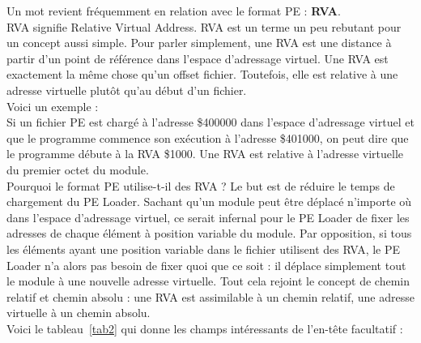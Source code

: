 Un mot revient fréquemment en relation avec le format PE : \textbf{RVA}.\\
RVA signifie Relative Virtual Address. RVA est un terme un peu rebutant pour un concept aussi simple. Pour parler simplement, une RVA est une distance à partir d'un point de référence dans l'espace d'adressage virtuel. Une RVA est exactement la même chose qu'un offset fichier. Toutefois, elle est relative à une adresse virtuelle plutôt qu'au début d'un fichier.\\
Voici un exemple :\\
Si un fichier PE est chargé à l'adresse \$400000 dans l'espace d'adressage virtuel et que le programme commence son exécution à l'adresse \$401000, on peut dire que le programme débute à la RVA \$1000. Une RVA est relative à l'adresse virtuelle du premier octet du module.\\
Pourquoi le format PE utilise-t-il des RVA ? Le but est de réduire le temps de chargement du PE Loader. Sachant qu'un module peut être déplacé n'importe où dans l'espace d'adressage virtuel, ce serait infernal pour le PE Loader de fixer les adresses de chaque élément à position variable du module. Par opposition, si tous les éléments ayant une position variable dans le fichier utilisent des RVA, le PE Loader n'a alors pas besoin de fixer quoi que ce soit : il déplace simplement tout le module à une nouvelle adresse virtuelle. Tout cela rejoint le concept de chemin relatif et chemin absolu : une RVA est assimilable à un chemin relatif, une adresse virtuelle à un chemin absolu.\\

Voici le tableau~\ref{tab2} qui donne les champs intéressants de l'en-tête facultatif : 

